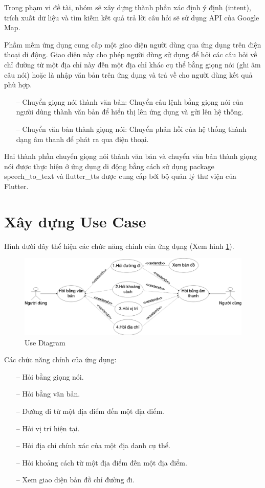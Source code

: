 Trong phạm vi đề tài, nhóm sẽ xây dựng thành phần xác định ý định (intent), trích xuất dữ liệu và tìm kiếm kết quả trả lời câu hỏi sẽ sử dụng API của Google Map\cite{google-map}.

Phầm mềm ứng dụng cung cấp một giao diện người dùng qua ứng dụng trên điện thoại di động. Giao diện này cho phép người dùng sử dụng để hỏi các câu hỏi về chỉ đường từ một địa chỉ này đến một địa chỉ khác cụ thể bằng giọng nói (ghi âm câu nói) hoặc là nhập văn bản trên ứng dụng và trả về cho người dùng kết quả phù hợp.
\begin{itemize}
    \item[--] Chuyển giọng nói thành văn bản: Chuyển câu lệnh bằng giọng nói của người dùng thành văn bản để hiển thị lên ứng dụng và gửi lên hệ thống.
    \item[--] Chuyển văn bản thành giọng nói: Chuyển phản hồi của hệ thống thành dạng âm thanh để phát ra qua điện thoại.
\end{itemize}

Hai thành phần chuyển giọng nói thành văn bản và chuyển văn bản thành giọng nói được thực hiện ở ứng dụng di động bằng cách sử dụng package speech\_to\_text\cite{stt} và flutter\_tts\cite{tts} được cung cấp bởi bộ quản lý thư viện của Flutter.

\section{Xây dựng Use Case}
Hình dưới đây thể hiện các chức năng chính của ứng dụng (Xem hình \ref{fig:UC}). 
\begin{figure}[H]
    \centering
    \includegraphics[width=15cm]{images/ChatbotSRS-UseCase.png}
    \caption{Use Diagram}
    \label{fig:UC}
\end{figure}

Các chức năng chính của ứng dụng:
\begin{itemize}
    \item[--] Hỏi bằng giọng nói. 
    \item[--] Hỏi bằng văn bản.
    \item[--] Đường đi từ một địa điểm đến một địa điểm.
    \item[--] Hỏi vị trí hiện tại.
    \item[--] Hỏi địa chỉ chính xác của một địa danh cụ thể.
    \item[--] Hỏi khoảng cách từ một địa điểm đến một địa điểm.
    \item[--] Xem giao diện bản đồ chỉ đường đi. 
\end{itemize}

